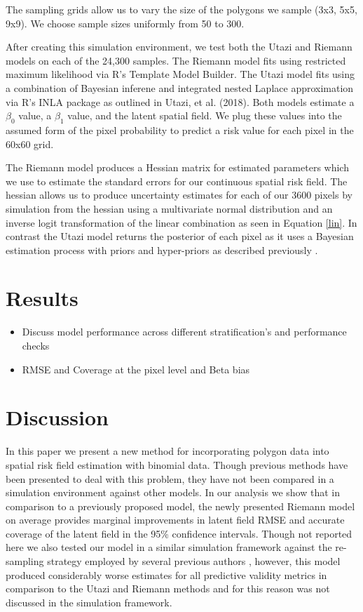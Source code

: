 \documentclass{article}
\begin{document}
The sampling grids allow us to vary the size of the polygons we sample (3x3, 5x5, 9x9). We choose sample sizes uniformly from 50 to 300.

After creating this simulation environment, we test both the Utazi and Riemann models on each of the 24,300 samples. The Riemann model fits using restricted maximum likelihood via R's Template Model Builder. The Utazi model fits using a combination of Bayesian inferene and integrated nested Laplace approximation via R's INLA package as outlined in Utazi, et al. (2018). Both models estimate a $\beta_0$ value, a  $\beta_1$ value, and the latent spatial field. We plug these values into the assumed form of the pixel probability to predict a risk value for each pixel in the 60x60 grid. 

The Riemann model produces a Hessian matrix for estimated parameters which we use to estimate the standard errors for our continuous spatial risk field. The hessian allows us to produce uncertainty estimates for each of our 3600 pixels by simulation from the hessian using a multivariate normal distribution and an inverse logit transformation of the linear combination as seen in Equation \ref{lin}. In contrast the Utazi model returns the posterior of each pixel as it uses a Bayesian estimation process with priors and hyper-priors as described previously \cite{Utazi2018a}.

\section{Results}\label{results}

\begin{itemize}
\item  Discuss model performance across different stratification's and performance checks
\item RMSE and Coverage at the pixel level and Beta bias
\end{itemize}

\section{Discussion}\label{discussion}

In this paper we present a new method for incorporating polygon data into spatial risk field estimation with binomial data. Though previous methods have been presented to deal with this problem, they have not been compared in a simulation environment against other models. In our analysis we show that in comparison to a previously proposed model, the newly presented Riemann model on average provides marginal improvements in latent field RMSE and accurate coverage of the latent field in the 95\% confidence intervals. Though not reported here we also tested our model in a similar simulation framework against the re-sampling strategy employed by several previous authors \cite{Golding2017, Reiner2018}, however, this model produced considerably worse estimates for all predictive validity metrics in comparison to the Utazi and Riemann methods and for this reason was not discussed in the simulation framework.  
\end{document}
